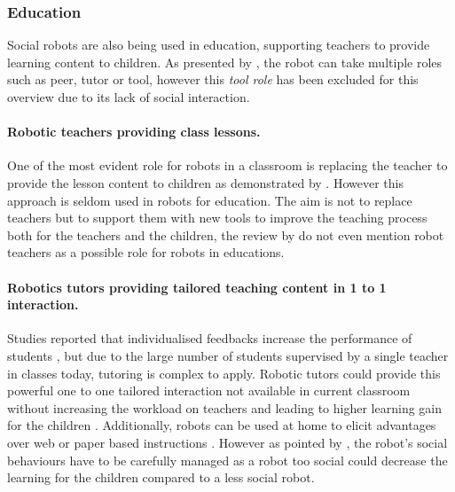 \subsubsection{Education} 
	Social robots are also being used in education, supporting teachers to provide learning content to children. As presented by \cite{mubin2013review}, the robot can take multiple roles such as peer, tutor or tool, however this \textit{tool role} has been excluded for this overview due to its lack of social interaction.
	
	\paragraph{Robotic teachers providing class lessons.} 
	One of the most evident role for robots in a classroom is replacing the teacher to provide the lesson content to children as demonstrated by \cite{verner2016science}. However this approach is seldom used in robots for education. The aim is not to replace teachers but to support them with new tools to improve the teaching process both for the teachers and the children, the review by \cite{mubin2013review} do not even mention robot teachers as a possible role for robots in educations. 
	
	\paragraph{Robotics tutors providing tailored teaching content in 1 to 1 interaction.} 
	Studies reported that individualised feedbacks increase the performance of students \citep{bloom19842}, but due to the large number of students supervised by a single teacher in classes today, tutoring is complex to apply. Robotic tutors could provide this powerful one to one tailored interaction not available in current classroom without increasing the workload on teachers and leading to higher learning gain for the children \citep{leyzberg2012physical,kennedy2016social,gordon2016affective}. Additionally, robots can be used at home to elicit advantages over web or paper based instructions \citep{han2005educational}. However as pointed by \citet{kennedy2015robot}, the robot's social behaviours have to be carefully managed as a robot too social could decrease the learning for the children compared to a less social robot. 
	
